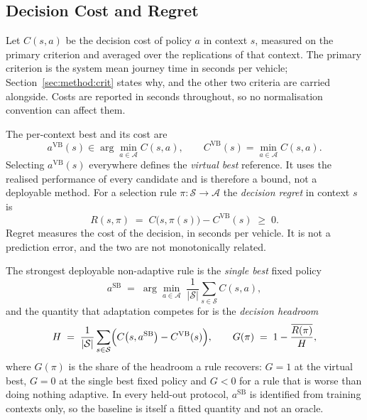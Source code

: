 \subsection{Decision Cost and Regret}
\label{sec:problem:regret}

Let $C(s,a)$ be the decision cost of policy $a$ in context $s$, measured on the
primary criterion and averaged over the replications of that context. The
primary criterion is the system mean journey time in seconds per vehicle;
Section~\ref{sec:method:crit} states why, and the other two criteria are carried
alongside. Costs are reported in seconds throughout, so no normalisation
convention can affect them.

The per-context best and its cost are
\begin{equation}
a^{\mathrm{VB}}(s) \in \arg\min_{a \in \mathcal{A}} C(s,a),
\qquad
C^{\mathrm{VB}}(s) = \min_{a \in \mathcal{A}} C(s,a).
\label{eq:vbs}
\end{equation}
Selecting $a^{\mathrm{VB}}(s)$ everywhere defines the \emph{virtual best}
reference. It uses the realised performance of every candidate and is therefore
a bound, not a deployable method. For a selection rule
$\pi : \mathcal{S} \to \mathcal{A}$ the \emph{decision regret} in context $s$ is
\begin{equation}
R(s,\pi) \;=\; C\bigl(s,\pi(s)\bigr) - C^{\mathrm{VB}}(s) \;\ge\; 0 .
\label{eq:regret}
\end{equation}
Regret measures the cost of the decision, in seconds per vehicle. It is not a
prediction error, and the two are not monotonically related.

The strongest deployable non-adaptive rule is the \emph{single best} fixed
policy
\begin{equation}
a^{\mathrm{SB}} \;=\; \arg\min_{a \in \mathcal{A}}\;
\frac{1}{|\mathcal{S}|}\sum_{s \in \mathcal{S}} C(s,a),
\label{eq:sbs}
\end{equation}
and the quantity that adaptation competes for is the \emph{decision headroom}
\begin{equation}
H \;=\; \frac{1}{|\mathcal{S}|}\sum_{s \in \mathcal{S}}
\Bigl( C\bigl(s,a^{\mathrm{SB}}\bigr) - C^{\mathrm{VB}}(s) \Bigr),
\qquad
G(\pi) \;=\; 1 - \frac{\overline{R(\pi)}}{H},
\label{eq:headroom}
\end{equation}
where $G(\pi)$ is the share of the headroom a rule recovers: $G=1$ at the
virtual best, $G=0$ at the single best fixed policy and $G<0$ for a rule that is
worse than doing nothing adaptive. In every held-out protocol,
$a^{\mathrm{SB}}$ is identified from training contexts only, so the baseline is
itself a fitted quantity and not an oracle.

